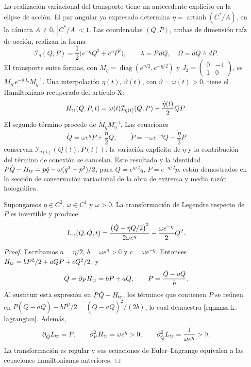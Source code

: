 La realización variacional del transporte tiene un antecedente explícito
en la elipse de acción. El par angular ya expresado determina
\(\eta=\operatorname{artanh}(C^*/A)\), en la cámara
\(A\ne0\), \(|C^*/A|<1\). Las coordenadas \((Q,P)\), ambas de
dimensión raíz de acción, realizan la forma
\[
 \mathcal I_\eta(Q,P)=\frac12\bigl(e^{-\eta}Q^2+e^\eta P^2\bigr),
 \qquad \lambda=P\,dQ,\quad \Omega=dQ\wedge dP.
\]
El transporte entre formas, con
\(M_\eta=\operatorname{diag}(e^{\eta/2},e^{-\eta/2})\) y
\(J_2=\left(\begin{smallmatrix}0&-1\\1&0\end{smallmatrix}\right)\),
es \(M_{\eta'}e^{-\vartheta J_2}M_\eta^{-1}\). Una
interpolación \(\eta(t)\), \(\vartheta(t)\), con
\(\dot\vartheta=\omega(t)>0\), tiene el Hamiltoniano recuperado
del artículo X:
\begin{equation}
 H_{\rm tr}(Q,P,t)=\omega(t)\mathcal I_{\eta(t)}(Q,P)
                 +\frac{\dot\eta(t)}2QP.
 \label{eq:mass-k-hamiltonian}
\end{equation}
El segundo término procede de \(\dot M_\eta M_\eta^{-1}\).
Las ecuaciones
\[
 \dot Q=\omega e^\eta P+\frac{\dot\eta}2Q,
 \qquad
 \dot P=-\omega e^{-\eta}Q-\frac{\dot\eta}2P
\]
conservan \(\mathcal I_{\eta(t)}(Q(t),P(t))\): la variación
explícita de \(\eta\) y la contribución del término de conexión
se cancelan. Este resultado y la identidad
\(P\dot Q-H_{\rm tr}=p\dot q-\omega(q^2+p^2)/2\), para
\(Q=e^{\eta/2}q\), \(P=e^{-\eta/2}p\), están demostrados
en la sección de conservación variacional de la obra de extrema y
media razón holográfica.

\begin{proposition}
Supongamos \(\eta\in C^2\), \(\omega\in C^1\) y \(\omega>0\).
La transformación de Legendre respecto de \(P\) es invertible y
produce
\begin{equation}
 L_{\rm tr}(Q,\dot Q,t)=
 \frac{\bigl(\dot Q-\dot\eta Q/2\bigr)^2}{2\omega e^\eta}
 -\frac{\omega e^{-\eta}}2Q^2.
 \label{eq:mass-k-lagrangian}
\end{equation}
\end{proposition}
\begin{proof}
Escribamos \(a=\dot\eta/2\), \(b=\omega e^\eta>0\) y
\(c=\omega e^{-\eta}\). Entonces
\(H_{\rm tr}=bP^2/2+aQP+cQ^2/2\), y
\[
 \dot Q=\partial_PH_{\rm tr}=bP+aQ,
 \qquad P=\frac{\dot Q-aQ}{b}.
\]
Al sustituir esta expresión en \(P\dot Q-H_{\rm tr}\), los
términos que contienen \(P\) se reúnen en
\(P(\dot Q-aQ)-bP^2/2=(\dot Q-aQ)^2/(2b)\), lo cual
demuestra \eqref{eq:mass-k-lagrangian}. Además,
\[
 \partial_{\dot Q}L_{\rm tr}=P,
 \qquad
 \partial_P^2H_{\rm tr}=\omega e^\eta>0,
 \qquad
 \partial_{\dot Q}^2L_{\rm tr}=\frac1{\omega e^\eta}>0.
\]
La transformación es regular y sus ecuaciones de Euler--Lagrange
equivalen a las ecuaciones hamiltonianas anteriores.
\end{proof}

